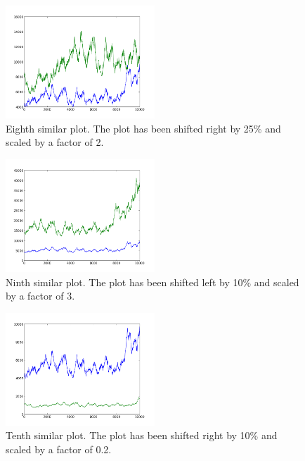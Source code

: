 \begin{figure}[h!]
    \centering
    \includegraphics[width=0.5\textwidth]{images/mutant_8.png}
    \caption{Eighth similar plot.  The plot has been shifted right by 25\% and scaled by a factor of 2.}
    \label{fig:mutant_8}
\end{figure}

\begin{figure}[h!]
    \centering
    \includegraphics[width=0.5\textwidth]{images/mutant_9.png}
    \caption{Ninth similar plot.  The plot has been shifted left by 10\% and scaled by a factor of 3.}
    \label{fig:mutant_9}
\end{figure}

\begin{figure}[h!]
    \centering
    \includegraphics[width=0.5\textwidth]{images/mutant_10.png}
    \caption{Tenth similar plot.  The plot has been shifted right by 10\% and scaled by a factor of 0.2.}
    \label{fig:mutant_10}
\end{figure}

